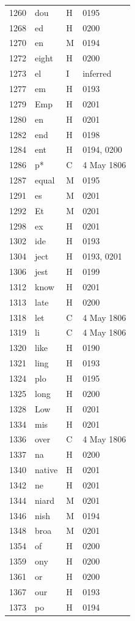 \begin{longtable}{@{}rlll@{}}
1260 & dou & H & 0195 \\
1268 & ed & H & 0200 \\
1270 & en & M & 0194 \\
1272 & eight & H & 0200 \\
1273 & el & I & inferred \\
1277 & em & H & 0193 \\
1279 & Emp & H & 0201 \\
1280 & en & H & 0201 \\
1282 & end & H & 0198 \\
1284 & ent & H & 0194, 0200 \\
1286 & p* & C & 4 May 1806 \\
1287 & equal & M & 0195 \\
1291 & es & M & 0201 \\
1292 & Et & M & 0201 \\
1298 & ex & H & 0201 \\
1302 & ide & H & 0193 \\
1304 & ject & H & 0193, 0201 \\
1306 & jest & H & 0199 \\
1312 & know & H & 0201 \\
1313 & late & H & 0200 \\
1318 & let & C & 4 May 1806 \\
1319 & li & C & 4 May 1806 \\
1320 & like & H & 0190 \\
1321 & ling & H & 0193 \\
1324 & plo & H & 0195 \\
1325 & long & H & 0200 \\
1328 & Low & H & 0201 \\
1334 & mis & H & 0201 \\
1336 & over & C & 4 May 1806 \\
1337 & na & H & 0200 \\
1340 & native & H & 0201 \\
1342 & ne & H & 0201 \\
1344 & niard & M & 0201 \\
1346 & nish & M & 0194 \\
1348 & broa & M & 0201 \\
1354 & of & H & 0200 \\
1359 & ony & H & 0200 \\
1361 & or & H & 0200 \\
1367 & our & H & 0193 \\
1373 & po & H & 0194 \\

\end{longtable}
